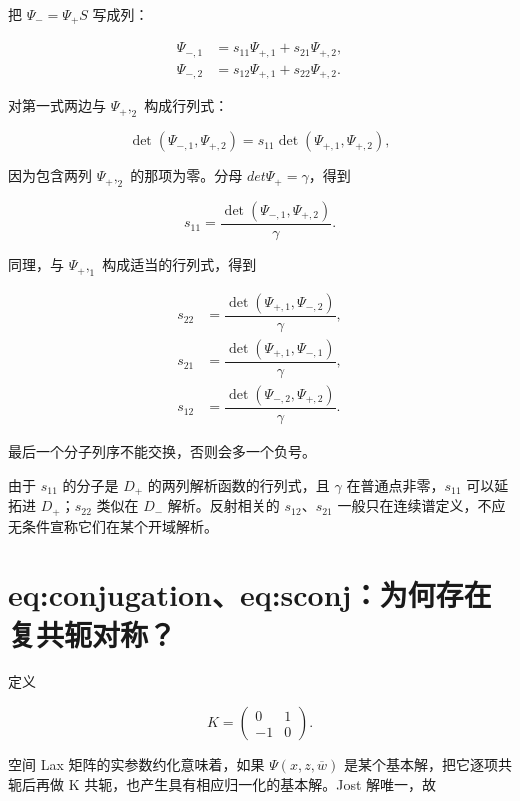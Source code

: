 把 $\Psi{}_{-}=\Psi{}_{+}S$ 写成列：\par

\[
\begin{aligned}
\Psi_{-,1}&=s_{11}\Psi_{+,1}+s_{21}\Psi_{+,2},\\
\Psi_{-,2}&=s_{12}\Psi_{+,1}+s_{22}\Psi_{+,2}.
\end{aligned}
\]

对第一式两边与 $\Psi{}_{+},_{2}$ 构成行列式：\par

\[
\det(\Psi_{-,1},\Psi_{+,2})
=s_{11}\det(\Psi_{+,1},\Psi_{+,2}),
\]

因为包含两列 $\Psi{}_{+},_{2}$ 的那项为零。分母 $det\Psi{}_{+}=\gamma{}$，得到\par

\[
s_{11}=\dfrac{\det(\Psi_{-,1},\Psi_{+,2})}{\gamma}.
\]

同理，与 $\Psi{}_{+},_{1}$ 构成适当的行列式，得到\par

\[
\begin{aligned}
s_{22}&=\dfrac{\det(\Psi_{+,1},\Psi_{-,2})}{\gamma},\\
s_{21}&=\dfrac{\det(\Psi_{+,1},\Psi_{-,1})}{\gamma},\\
s_{12}&=\dfrac{\det(\Psi_{-,2},\Psi_{+,2})}{\gamma}.
\end{aligned}
\]

最后一个分子列序不能交换，否则会多一个负号。\par

由于 $s_{11}$ 的分子是 $D_{+}$ 的两列解析函数的行列式，且 $\gamma{}$ 在普通点非零，$s_{11}$ 可以延拓进 $D_{+}$；$s_{22}$ 类似在 $D_{-}$ 解析。反射相关的 $s_{12}$、$s_{21}$ 一般只在连续谱定义，不应无条件宣称它们在某个开域解析。\par

\section{eq:conjugation、eq:sconj：为何存在复共轭对称？}

定义\par

\[
K=\begin{pmatrix}0&1\\-1&0\end{pmatrix}.
\]

空间 Lax 矩阵的实参数约化意味着，如果 $\Psi{}(x,z,\overline w)$ 是某个基本解，把它逐项共轭后再做 K 共轭，也产生具有相应归一化的基本解。Jost 解唯一，故\par

